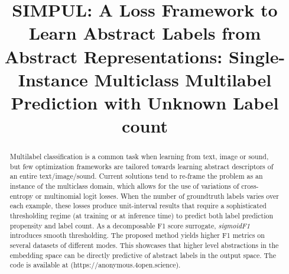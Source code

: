 \documentclass[sigconf,natbib,screen=true,review=true,anonymous]{acmart}
\begin{document}
\title{SIMPUL: A Loss Framework to Learn Abstract Labels from Abstract Representations: Single-Instance Multiclass Multilabel Prediction with Unknown Label count}

\begin{abstract}
  Multilabel classification is a common task when learning from text, image or sound, but few optimization frameworks are tailored towards learning abstract descriptors of an entire text/image/sound. Current solutions tend to re-frame the problem as an instance of the multiclass domain, which allows for the use of variations of cross-entropy or multinomial logit losses. When the number of groundtruth labels varies over each example, these losses produce unit-interval results that require a sophisticated thresholding regime (at training or at inference time) to predict both label prediction propensity and label count. As a decomposable F1 score surrogate, \emph{sigmoidF1} introduces smooth thresholding. The proposed method yields higher F1 metrics on several datasets of different modes. This showcases that higher level abstractions in the embedding space can be directly predictive of abstract labels in the output space. The code is available at (https://anonymous.4open.science).
  
\end{abstract}



\maketitle

\acresetall


%






\end{document}
